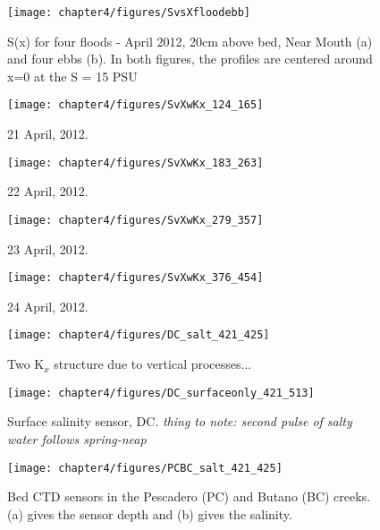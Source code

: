 \begin{figure}
	\texttt{[image: chapter4/figures/SvsXfloodebb]} 
\caption{S(x) for four floods - April 2012, 20cm above bed, Near Mouth (a) and four ebbs (b). In both figures, the profiles are centered around x=0 at the S = 15 PSU} \label{fig:SvsXall}
\end{figure}

\begin{figure}
	\texttt{[image: chapter4/figures/SvXwKx\_124\_165]} 
\caption{21 April, 2012. } \label{fig:Kx421}
\end{figure}

\begin{figure}
	\texttt{[image: chapter4/figures/SvXwKx\_183\_263]} 
\caption{22 April, 2012. } \label{fig:Kx422}
\end{figure}



\begin{figure}
	\texttt{[image: chapter4/figures/SvXwKx\_279\_357]} 
\caption{23 April, 2012. } \label{fig:Kx423}
\end{figure}



\begin{figure}
	\texttt{[image: chapter4/figures/SvXwKx\_376\_454]} 
\caption{24 April, 2012.} \label{fig:Kx424}
\end{figure}



\begin{figure}
	\texttt{[image: chapter4/figures/DC\_salt\_421\_425]}
	\caption{Two K$_x$ structure due to vertical processes...} \label{fig:SDCApr2012} \label{fig:DC_salt_421_425}
\end{figure}


\begin{figure}
	\texttt{[image: chapter4/figures/DC\_surfaceonly\_421\_513]}
	\caption{Surface salinity sensor, DC. \emph{thing to note: second pulse of salty water follows spring-neap}} \label{fig:SsurfLT}
\end{figure}


\begin{figure}
	\texttt{[image: chapter4/figures/PCBC\_salt\_421\_425]}
	\caption{Bed CTD sensors in the Pescadero (PC) and Butano (BC) creeks. (a) gives the sensor depth and (b) gives the salinity.} \label{fig:PCBC421:425}
\end{figure}



